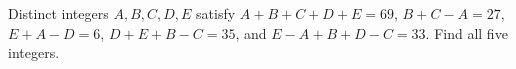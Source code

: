 Distinct integers $ A,B,C,D,E $ satisfy $ A+B+C+D+E=69 $, $ B+C-A=27 $, $ E+A-D=6 $, $ D+E+B-C=35 $, and $ E-A+B+D-C=33 $. Find all five integers.
